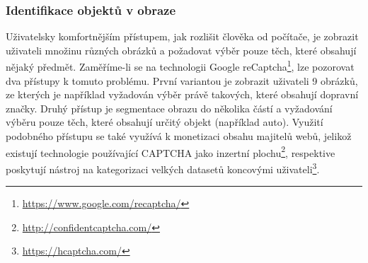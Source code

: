 \documentclass[
  field=ainfp,
  master=true,
  biblatex,
  sourcecodes=false,
  theorems=false,
  glossaries,
  index
]{kidiplom}
\begin{document}
\subsubsection*{Identifikace objektů v obraze}
Uživatelsky komfortnějším přístupem, jak rozlišit člověka od počítače, je zob\-razit uživateli množinu různých obrázků a požadovat výběr pouze těch, které obsahují nějaký předmět. Zaměříme-li se na technologii Google reCaptcha\footnote{\url{https://www.google.com/recaptcha/}}, lze pozorovat dva přístupy k tomuto problému. První variantou je zobrazit uživateli 9 obrázků, ze kterých je například vyžadován výběr právě takových, které obsahují dopravní značky. Druhý přístup je segmentace obrazu do několika částí a vyžadování výběru pouze těch, které obsahují určitý objekt (například auto). Využití podobného přístupu se také využívá k monetizaci obsahu majitelů webů, jelikož existují technologie používající CAPTCHA jako inzertní plochu\footnote{\url{http://confidentcaptcha.com/}}, respektive poskytují nástroj na kategorizaci velkých datasetů koncovými uživateli\footnote{\url{https://hcaptcha.com/}}. 
\end{document}
